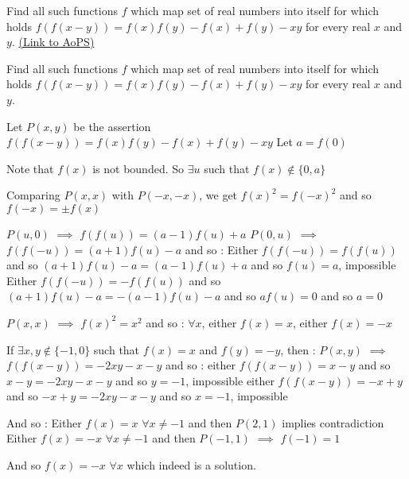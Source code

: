 \begin{problem}
	Find all such functions $f$ which map set of real numbers into itself for which holds $ f(f(x-y)) = f(x)f(y)-f(x)+f(y)-xy $ for every real $x$ and $y$.
	\flushright \href{https://artofproblemsolving.com/community/c6h573331}{(Link to AoPS)}
\end{problem}



\begin{solution}
	\begin{tcolorbox}Find all such functions $f$ which map set of real numbers into itself for which holds $ f(f(x-y)) = f(x)f(y)-f(x)+f(y)-xy $ for every real $x$ and $y$.\end{tcolorbox}
Let $P(x,y)$ be the assertion $f(f(x-y))=f(x)f(y)-f(x)+f(y)-xy$
Let $a=f(0)$

Note that $f(x)$ is not bounded. So $\exists u$ such that $f(x)\notin\{0,a\}$

Comparing $P(x,x)$ with $P(-x,-x)$, we get $f(x)^2=f(-x)^2$ and so $f(-x)=\pm f(x)$

$P(u,0)$ $\implies$ $f(f(u))=(a-1)f(u)+a$
$P(0,u)$ $\implies$ $f(f(-u))=(a+1)f(u)-a$ and so :
Either $f(f(-u))=f(f(u))$ and so $(a+1)f(u)-a=(a-1)f(u)+a$ and so $f(u)=a$, impossible
Either $f(f(-u))=-f(f(u))$ and so $(a+1)f(u)-a=-(a-1)f(u)-a$ and so $af(u)=0$ and so $a=0$

$P(x,x)$ $\implies$ $f(x)^2=x^2$ and so :
$\forall x$, either $f(x)=x$, either $f(x)=-x$

If $\exists x,y\notin\{-1,0\}$ such that $f(x)=x$ and $f(y)=-y$, then :
$P(x,y)$ $\implies$ $f(f(x-y))=-2xy-x-y$ and so :
either $f(f(x-y))=x-y$ and so $x-y=-2xy-x-y$ and so $y=-1$, impossible
either $f(f(x-y))=-x+y$ and so $-x+y=-2xy-x-y$ and so $x=-1$, impossible

And so :
Either $f(x)=x$ $\forall x\ne -1$ and then $P(2,1)$ implies contradiction
Either $f(x)=-x$ $\forall x\ne -1$ and then $P(-1,1)$ $\implies$ $f(-1)=1$

And so $\boxed{f(x)=-x}$ $\forall x$ which indeed is a solution.
\end{solution}



